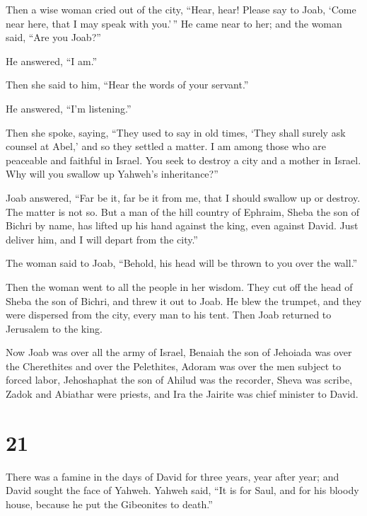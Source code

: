  Then a wise woman cried out of the city, ``Hear, hear!
Please say to Joab, `Come near here, that I may speak with you.'\,''
 He came near to her; and the woman said, ``Are you
Joab?''

He answered, ``I am.''

Then she said to him, ``Hear the words of your servant.''

He answered, ``I'm listening.''

 Then she spoke, saying, ``They used to say in old times,
`They shall surely ask counsel at Abel,' and so they settled a matter.
 I am among those who are peaceable and faithful in
Israel. You seek to destroy a city and a mother in Israel. Why will you
swallow up Yahweh's inheritance?''

 Joab answered, ``Far be it, far be it from me, that I
should swallow up or destroy.  The matter is not so. But
a man of the hill country of Ephraim, Sheba the son of Bichri by name,
has lifted up his hand against the king, even against David. Just
deliver him, and I will depart from the city.''

The woman said to Joab, ``Behold, his head will be thrown to you over
the wall.''

 Then the woman went to all the people in her wisdom.
They cut off the head of Sheba the son of Bichri, and threw it out to
Joab. He blew the trumpet, and they were dispersed from the city, every
man to his tent. Then Joab returned to Jerusalem to the king.

 Now Joab was over all the army of Israel, Benaiah the
son of Jehoiada was over the Cherethites and over the Pelethites,
 Adoram was over the men subject to forced labor,
Jehoshaphat the son of Ahilud was the recorder,  Sheva
was scribe, Zadok and Abiathar were priests,  and Ira the
Jairite was chief minister to David.

\hypertarget{section-20}{%
\section{21}\label{section-20}}

 There was a famine in the days of David for three years,
year after year; and David sought the face of Yahweh. Yahweh said, ``It
is for Saul, and for his bloody house, because he put the Gibeonites to
death.''


